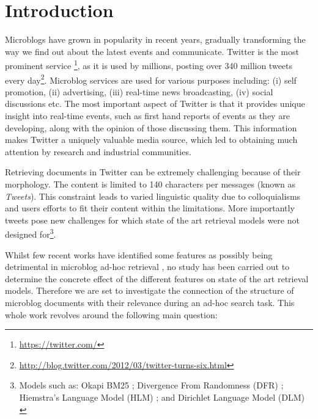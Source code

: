 \section{Introduction}
\label{introduction}

Microblogs have grown in popularity in recent years, gradually transforming the way we find out about the latest events and communicate. Twitter is the most prominent service \footnote{\url{https://twitter.com/}}, as it is used by millions, posting over 340 million tweets every day\footnote{\url{http://blog.twitter.com/2012/03/twitter-turns-six.html}}. Microblog services are used for various purposes including: (i) self promotion, (ii) advertising, (iii) real-time news broadcasting, (iv) social discussions etc. The most important aspect of Twitter is that it provides unique insight into real-time events, such as first hand reports of events as they are developing, along with the opinion of those discussing them.
This information makes Twitter a uniquely valuable media source, which led to obtaining much attention by research and industrial communities.

Retrieving documents in Twitter can be extremely challenging because of their morphology. The content is limited to 140 characters per messages (known as \emph{Tweets}). This constraint leads to varied linguistic quality \cite{teevan2011twittersearch} due to colloquialisms and users efforts to fit their content within the limitations. More importantly tweets pose new challenges for which state of the art retrieval models were not designed for\footnote{Models such as: Okapi BM25 \cite{robertson2009probabilistic}; Divergence From Randomness (DFR) \cite{amati2003probabilistic}; Hiemstra's Language Model (HLM) \cite{model}; and Dirichlet Language Model (DLM) \cite{zhai2001study}}. 

Whilst few recent works have identified some features as possibly being detrimental in microblog ad-hoc retrieval \cite{naveed2011searching}, no study has been carried out to determine the concrete effect of the different features on state of the art retrieval models. 
Therefore we are set to investigate the connection of the structure of microblog documents with their relevance during an ad-hoc search task. This whole work revolves around the following main question: 

